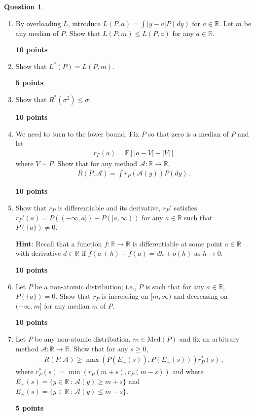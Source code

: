 \documentclass{article}
\newcommand{\R}{\mathbb{R}}
\DeclareMathOperator*{\1}{\mathbbm{1}}
\newcommand{\E}{\mathbb E}
\newcommand{\EE}[1]{\E[#1]}
\newcounter{DocPoints}
\newcounter{QuestionPoints}
\newcommand{\points}[1]{	\par\mbox{}\par\noindent\hfill {\bf #1 points}	\addtocounter{DocPoints}{#1}
	\addtocounter{QuestionPoints}{#1}
}
\theoremstyle{definition}
\newtheorem{question}{Question}
\theoremstyle{remark}
\newcommand{\hint}{\noindent \textbf{Hint}:\xspace}
\newcommand{\cA}{\mathcal{A}}
\begin{document}
\begin{question}
\begin{enumerate}[(Q1)]
\points{10}

\item By overloading $L$, introduce $L(P,a) = \int |y-a| P(dy)$ for $a\in \R$. Let $m$ be any median of $P$. Show that 
$L(P,m)\le L(P,a)$ for any $a\in \R$.

\points{10}
\item Show that $L^*(P)=L(P,m)$.

\points{5}

\item Show that $R^*(\sigma^2) \le \sigma$.
\points{10}

\item We need to turn to the lower bound. 
Fix  $P$ so that zero is a median of $P$ and let
\begin{align*}
r_P(a) = \EE{|a-V|-|V|}
\end{align*}
where $V\sim P$.
Show that for any method $\cA:\R \to \R$,
\begin{align}\label{eq:riskexp}
R(P,\cA) = \int r_P(\cA(y)) P(dy) \,.
\end{align}

\points{10}
\item Show that $r_P$ is differentiable and its derivative, $r_P'$ satisfies $r_P'(a) = P((-\infty,a])-P([a,\infty))$ for any $a\in \R$ such that $P(\{a\})\ne 0$.

\hint Recall that a function $f:\R \to \R$ is differentiable at some point $a\in \R$ with derivative $d\in \R$ if $f(a+h) - f(a) = d h + o(h)$ as $h\to 0$.

\points{10}

\item Let $P$ be a non-atomic distribution; i.e., $P$ is such that for any $a\in \R$, $P(\{a\}) = 0$.
Show that $r_P$ is increasing on $[m,\infty)$ and decreasing on $(-\infty,m]$ for any median $m$ of $P$.

\points{10}

\item \label{p:risk2prob}

Let  $P $ be any non-atomic distribution, $m\in \text{Med}(P)$ and fix an arbitrary method $\cA:\R \to \R$. Show that for any $s\ge 0$,
\begin{align}\label{eq:risklblap}
R(P,\cA) \ge  \max( P(E_+(s)),P(E_-(s))) r^*_P(s)\,,
\end{align}
where $r^*_P(s) = \min(r_P(m+s),r_P(m-s))$ and
where $E_+(s) = \{y\in \R\,:\, \cA(y)\ge m+ s\}$
and $E_-(s) = \{y\in \R\,:\, \cA(y)\le m- s\}$.

\points{5}


\end{enumerate}
\end{question}
\end{document}
